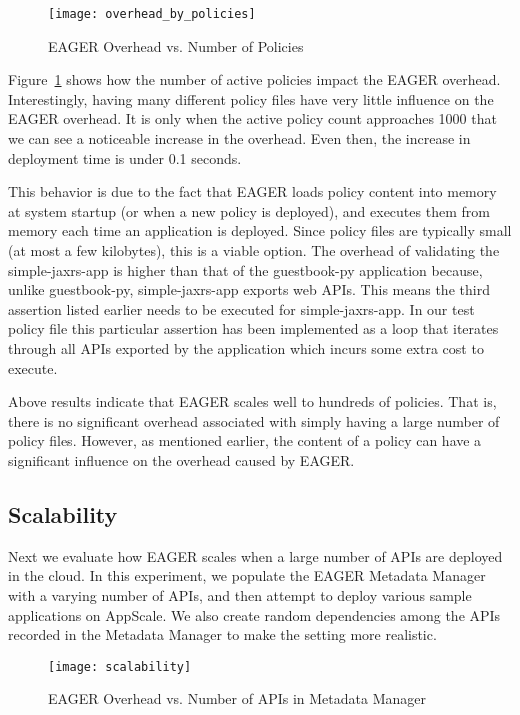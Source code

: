 \begin{figure}
\centering
\texttt{[image: overhead\_by\_policies]}
\caption{EAGER Overhead vs. Number of Policies}
\label{fig:overhead_by_policies}
\end{figure}

Figure~\ref{fig:overhead_by_policies} shows how the number of active policies impact the EAGER overhead. Interestingly, having many
different policy files have very little influence on the EAGER overhead. It is only when the active policy count approaches 1000 that we
can see a noticeable increase in the overhead. Even then, the increase in deployment time is under 0.1 seconds. 

This behavior is due to the fact that EAGER loads policy content into memory at system
startup (or when a new policy is deployed), and executes them from memory each time an application is deployed. Since policy files are 
typically small (at most a few kilobytes), this is a viable option. The overhead of validating the simple-jaxrs-app is higher than that of the
guestbook-py application because, unlike guestbook-py, simple-jaxrs-app exports web APIs. This means the third assertion listed earlier
needs to be executed for simple-jaxrs-app. In our test policy file this particular assertion has been implemented as a loop that iterates through 
all APIs exported by the application which incurs some extra cost to execute.

Above results indicate that EAGER scales well to hundreds of policies. That is, there is no significant overhead associated with simply having
a large number of policy files. However, as mentioned earlier, the content of a policy can have a significant influence on the overhead
 caused by EAGER.
 
\subsection{Scalability}
Next we evaluate how EAGER scales when a large number of APIs are deployed in the cloud. In this experiment, we populate the EAGER
Metadata Manager with a varying number of APIs, and then attempt to deploy various sample applications on AppScale. We also create
random dependencies among the APIs recorded in the Metadata Manager to make the setting more realistic.

\begin{figure}
\centering
\texttt{[image: scalability]}
\caption{EAGER Overhead vs. Number of APIs in Metadata Manager}
\label{fig:scalability}
\end{figure}

